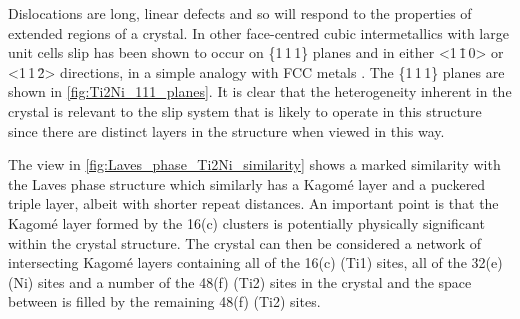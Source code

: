 Dislocations are long, linear defects and so will respond to the properties of extended regions of a crystal. In other face-centred cubic intermetallics with large unit cells slip has been shown to occur on \{1\,1\,1\} planes and in either <1\,\={1}\,0> or <1\,1\,\={2}> directions, in a simple analogy with FCC metals \cite{Davis2015}. The \{1\,1\,1\} planes are shown in \autoref{fig:Ti2Ni_111_planes}. It is clear that the heterogeneity inherent in the crystal is relevant to the slip system that is likely to operate in this structure since there are distinct layers in the structure when viewed in this way. 

The view in \autoref{fig:Laves_phase_Ti2Ni_similarity} shows a marked similarity with the Laves phase structure which similarly has a Kagom\'{e} layer and a puckered triple layer, albeit with shorter repeat distances. An important point is that the Kagom\'{e} layer formed by the 16(c) clusters is potentially physically significant within the crystal structure. The crystal can then be considered a network of intersecting Kagom\'e layers containing all of the 16(c) (Ti1) sites, all of the 32(e) (Ni) sites and a number of the 48(f) (Ti2) sites in the crystal and the space between is filled by the remaining 48(f) (Ti2) sites.


